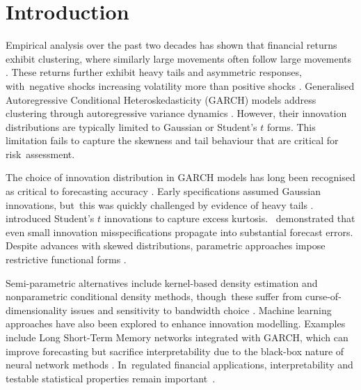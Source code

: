 \documentclass[risks,article,accept,pdftex,moreauthors]{Definitions/mdpi}
\begin{document}
\section{Introduction}

Empirical analysis over the past two decades has shown that financial returns exhibit clustering, where similarly large movements often follow large movements \citep{cont2001empirical, aloud2013stylized}. These returns further exhibit heavy tails and asymmetric responses, with~negative shocks increasing volatility more than positive shocks \citep{cont2001empirical}. Generalised Autoregressive Conditional Heteroskedasticity (GARCH) models address clustering through autoregressive variance dynamics \citep{bollerslev1986generalised}. However, their innovation distributions are typically limited to Gaussian or Student's $t$ forms. This limitation fails to capture the skewness and tail behaviour that are critical for risk~assessment.

The choice of innovation distribution in GARCH models has long been recognised as critical to forecasting accuracy \citep{bollerslev1987conditionally, ederington2005forecasting}. Early specifications assumed Gaussian innovations, but~this was quickly challenged by evidence of heavy tails \citep{bollerslev1986generalised}. \cite{bollerslev1987conditionally} introduced Student's $t$ innovations to capture excess kurtosis.~\cite{hansen1994autoregressive} demonstrated that even small innovation misspecifications propagate into substantial forecast errors. Despite advances with skewed distributions, parametric approaches impose restrictive functional forms \citep{fernandez1998multivariate}.

Semi-parametric alternatives include kernel-based density estimation and nonparametric conditional density methods, though~these suffer from curse-of-dimensionality issues and sensitivity to bandwidth choice \citep{engle1993measuring, hansen2004nonparametric, silverman1986density}. Machine learning approaches have also been explored to enhance innovation modelling. Examples include Long Short-Term Memory networks integrated with GARCH, which can improve forecasting but sacrifice interpretability due to the black-box nature of neural network methods \citep{kim2018forecasting, hossain2008comparison}. In~regulated financial applications, interpretability and testable statistical properties remain \mbox{important \citep{harvey2022machine, rudin2019stop}}.
\end{document}
